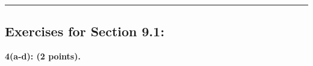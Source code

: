 \documentclass[12pt]{article}  %
\begin{document}
\rule{6in}{.1pt}       %


\subsection*{Exercises for Section 9.1:}     

\noindent
{\bf 4(a-d): (2 points).}
\end{document}
